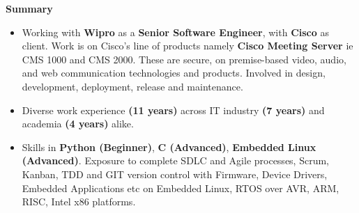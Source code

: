 \begin{center}
    \textbf{Summary}
\end{center}

\begin{itemize}
            \item {Working with \textbf{Wipro} as a \textbf{Senior Software Engineer}, with \textbf{Cisco} as client. Work is on Cisco's line of products namely \textbf{Cisco Meeting Server} ie CMS 1000 and CMS 2000. These are secure, on premise-based video, audio, and web communication technologies and products. Involved in design, development, deployment, release and maintenance.}\\
           
            
            \item {Diverse work experience \textbf{(11 years)} across IT industry \textbf{(7 years)} and academia \textbf{(4 years)} alike.}\\
            
            
            \item {Skills in  \textbf{Python (Beginner)}, \textbf{C (Advanced)}, \textbf{Embedded Linux (Advanced)}. Exposure to complete SDLC and Agile processes, Scrum, Kanban, TDD and GIT version control with Firmware, Device Drivers, Embedded Applications etc on Embedded Linux, RTOS over AVR, ARM, RISC, Intel x86 platforms.}\\
            
            

\end{itemize}
